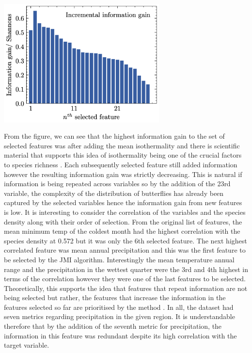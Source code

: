 \documentclass[prl,showpacs,superscriptaddress,twocolumn,longbibliography]{revtex4-1}
\begin{document}
\begin{center}\includegraphics[width=240pt]{Features.png}\end{center}


From the figure, we can see that the highest information gain to the set of selected features was after adding the mean isothermality and there is scientific material that supports this idea of isothermality being one of the crucial factors to species richness \cite{rueda-m_environmental_2021}. Each subsequently selected feature still added information however the resulting information gain was strictly decreasing. This is natural if information is being repeated across variables so by the addition of the 23rd variable, the complexity of the distribution of butterflies has already been captured by the selected variables hence the information gain from new features is low. 
\newline
\newline
It is interesting to consider the correlation of the variables and the species density along with their order of selection. From the original list of features, the mean minimum temp of the coldest month had the highest correlation with the species density at 0.572 but it was only the 6th selected feature. The next highest correlated feature was mean annual precipitation and this was the first feature to be selected by the JMI algorithm. Interestingly the mean temperature annual range and the precipitation in the wettest quarter were the 3rd and 4th highest in terms of the correlation however they were one of the last features to be selected. Theoretically, this supports the idea that features that repeat information are not being selected but rather, the features that increase the information in the features selected so far are prioritised by the method \cite{afshar_dimensionality_2021}. In all, the dataset had seven metrics regarding precipitation in the given region. It is understandable therefore that by the addition of the seventh metric for precipitation, the information in this feature was redundant despite its high correlation with the target variable.
\end{document}
